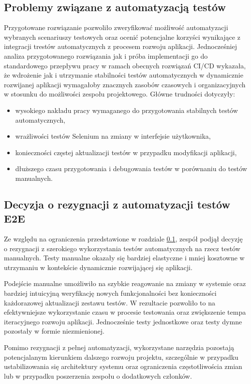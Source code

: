\subsection{Problemy związane z automatyzacją testów}
\label{sec:auotmation_problems}
\par
Przygotowane rozwiązanie pozwoliło zweryfikować możliwość automatyzacji wybranych scenariuszy testowych oraz ocenić potencjalne korzyści wynikające z integracji trestów automatycznych z procesem rozwoju aplikacji.
Jednocześniej analiza przygotowanego rozwiązania jak i próba implementacji go do standardowego przepływu pracy w ramach obecnych rozwiązań \gls{CI/CD} wykazała, że wdrożenie jak i utrzymanie stabilności testów automatycznych w dynamicznie rozwijanej aplikacji wymagałoby znacznych zasobów czasowych i organizacyjnych w stosunku do możliwości zespołu projektowego.
Główne trudności dotyczyły:
\begin{itemize}
    \item wysokiego nakładu pracy wymaganego do przygotowania stabilnych testów automatycznych,
    \item wrażliwości testów \gls{Selenium} na zmiany w interfejsie użytkownika,
    \item konieczności częstej aktualizacji testów w przypadku modyfikacji aplikacji,
    \item dłuższego czasu przygotowania i debugowania testów w porównaniu do testów manualnych.
\end{itemize}
\subsection{Decyzja o rezygnacji z automatyzacji testów E2E}
Ze względu na ograniczenia przedstawione w rozdziale \ref{sec:auotmation_problems}, zespół podjął decyzję o rezygnacji z szerokiego wykorzystania testów automatycznych na rzecz testów manualnych.
Testy manualne okazały się bardziej elastyczne i mniej kosztowne w utrzymaniu w kontekście dynamicznie rozwijającej się aplikacji.
\par
Podejście manualne umożliwiło na szybkie reagowanie na zmiany w systemie oraz bardziej intuicyjną weryfikację nowych funkcjonalności bez konieczności każdorazowej aktualizacji zestawu testów.
W rezultacie pozwoliło to na efektywniejsze wykorzystanie czasu w procesie testowania oraz zwiększenie tempa iteracyjnego rozwoju aplikacji.
Jednocześnie testy jednostkowe oraz testy dymne pozostały w formie niezmienionej.
\par
Pomimo rezygnacji z pełnej automatyzacji, wykorzystane narzędzia pozostają potencjalanym kierunkiem dalszego rozwoju projektu, szczególnie w przypadku ustabilizowania się architektury systemu oraz ograniczenia częstotliwościa zmian lub w przypadku poszerzenia zespołu o dodatkowych członków.
